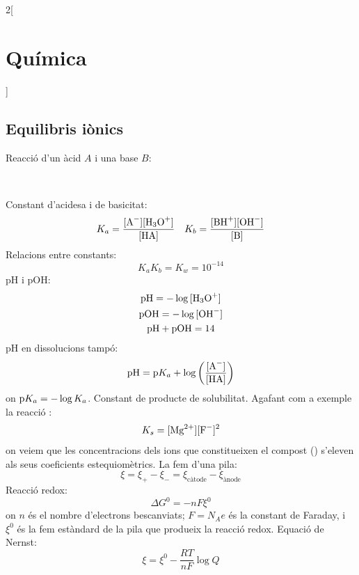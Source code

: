 \documentclass[class=article,10pt,crop=false]{standalone}
\begin{document}
\begin{multicols}{2}[\section{Química}]
\subsection{Equilibris iònics}
Reacció d'un àcid $A$ i una base $B$:
\begin{center}
    \\
\end{center}
Constant d'acidesa i de basicitat: $$K_a=\frac{\ce{[A^-][H_3O^+]}}{\ce{[HA]}}\quad K_b=\frac{\ce{[BH^+][OH^-]}}{\ce{[B]}}$$
Relacions entre constants: $$K_aK_b=K_w=10^{-14}$$
pH i pOH:
\begin{gather*}
    \ce{pH}=-\log\ce{[H_3O^+]}\\
    \ce{pOH}=-\log\ce{[OH^-]}\\
    \ce{pH}+\ce{pOH}=14
\end{gather*}
pH en dissolucions tampó: $$\ce{pH}=\ce{p}K_a+\log\left(\frac{\ce{[A^-]}}{\ce{[HA]}}\right)$$ {\footnotesize on $\ce{p}K_a=-\log K_a$.}\newline
Constant de producte de solubilitat. Agafant com a exemple la reacció : $$K_s=\ce{[Mg^{2+}][F^-]^2}$$ {\footnotesize on veiem que les concentracions dels ions que cons\-ti\-tu\-eix\-en el compost () s'eleven als seus coeficients estequiomètrics.}\newline
La fem d'una pila: $$\xi=\xi_+-\xi_-=\xi_\text{càtode}-\xi_\text{ànode}$$
Reacció redox: $$\Delta G^0=-nF\xi^0$$ {\footnotesize on $n$ és el nombre d'electrons bescanviats; $F=N_Ae$ és la constant de Faraday, i $\xi^0$ és la fem estàndard de la pila que produeix la reacció redox.}\newline
Equació de Nernst: $$\xi=\xi^0-\frac{RT}{nF}\log Q$$

\end{multicols}
\end{document}
